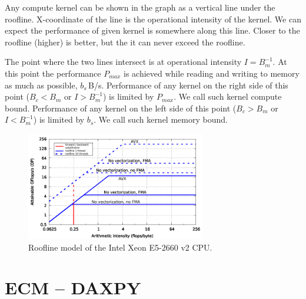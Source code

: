 {Any compute kernel can be shown in the graph as a vertical line under the roofline. X-coordinate of the line is the operational intensity of the kernel.
We can expect the performance of given kernel is somewhere along this line. Closer to the roofline (higher) is better, but the it can never exceed the roofline.

The point where the two lines intersect is at operational intensity $I = B_m^{-1}$. At this point the performance $P_{max}$ is achieved while reading and writing to memory as much as possible, $b_s$\,B/s.
Performance of any kernel on the right side of this point ($B_c < B_m$ or $I > B_m^{-1}$) is limited by $P_{max}$. We call such kernel compute bound.
Performance of any kernel on the left side of this point ($B_c > B_m$ or $I < B_m^{-1}$) is limited by $b_s$. We call such kernel memory bound.


\begin{figure}[H]
   \centering
   \includegraphics[width=0.7\textwidth,clip=true]{images/roofline_emmy_Xeon2660v2}
   \caption{Roofline model of the  Intel Xeon E5-2660 v2 CPU.}
  \label{fig:roofline_emmy}
\end{figure}








\section{ECM -- DAXPY}
\label{sec:epm}

}
